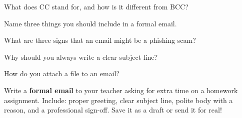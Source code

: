 \begin{reviewqs}
  \item What does CC stand for, and how is it different from BCC?
  \item Name three things you should include in a formal email.
  \item What are three signs that an email might be a phishing scam?
  \item Why should you always write a clear subject line?
  \item How do you attach a file to an email?
\end{reviewqs}

\begin{challenge}
Write a \textbf{formal email} to your teacher asking for extra time on a homework assignment. Include: proper greeting, clear subject line, polite body with a reason, and a professional sign-off. Save it as a draft or send it for real!
\end{challenge}
